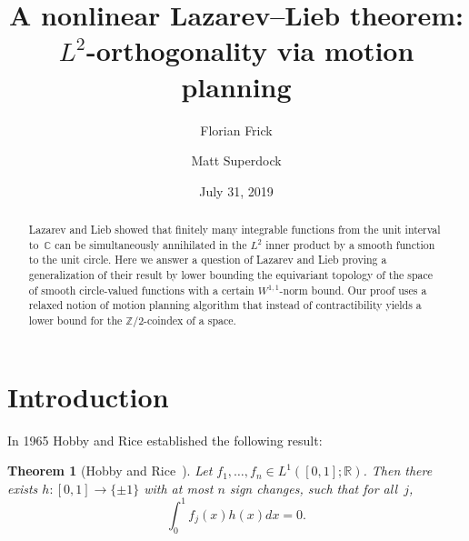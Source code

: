\documentclass[11pt, reqno, english]{amsart}
\theoremstyle{plain}
\newtheorem{theorem}{Theorem}[section]
\theoremstyle{definition}
\newcommand{\R}{\mathbb{R}}
\newcommand{\C}{\mathbb{C}}
\newcommand{\Z}{\mathbb{Z}}
\begin{document}

\title[A nonlinear Lazarev--Lieb theorem]{A nonlinear Lazarev--Lieb theorem: \\ $L^2$-orthogonality via motion planning}






\author{Florian Frick}
\address[FF]{Dept.\ Math.\ Sciences, Carnegie Mellon University, Pittsburgh, PA 15213, USA}

\author{Matt Superdock}
\address[MS]{Dept.\ Math.\ Sciences, Carnegie Mellon University, Pittsburgh, PA 15213, USA}





\begin{abstract}
\small
Lazarev and Lieb showed that finitely many integrable functions from the unit interval to~$\C$ can be simultaneously annihilated in the $L^2$ inner product by a smooth function to the unit circle. Here we answer a question of Lazarev and Lieb proving a generalization of their result by lower bounding the equivariant topology of the space of smooth circle-valued functions with a certain $W^{1,1}$-norm bound. Our proof uses a relaxed notion of motion planning algorithm that instead of contractibility yields a lower bound for the $\Z/2$-coindex of a space.
\end{abstract}

\date{July 31, 2019}
\maketitle

\section{Introduction}

In 1965 Hobby and Rice established the following result:

\begin{theorem}[Hobby and Rice~\cite{hobby1965}]\label{hr}
  Let $f_1, \ldots , f_{n} \in L^{1}([0, 1]; \R)$. Then there exists ${h\colon
  [0, 1] \rightarrow \{\pm 1\}}$ with at most $n$ sign changes, such that for
  all~$j$,
  $$\int_{0}^{1}f_{j}(x)h(x)dx = 0.$$
\end{theorem}
\end{document}
